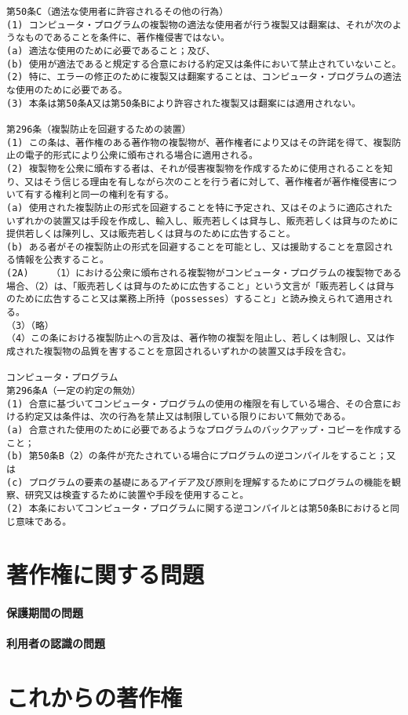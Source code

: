 \documentclass[a4j]{jsarticle}
\begin{document}
\begin{verbatim}
第50条C（適法な使用者に許容されるその他の行為）
(1)	コンピュータ・プログラムの複製物の適法な使用者が行う複製又は翻案は、それが次のようなものであることを条件に、著作権侵害ではない。
(a)	適法な使用のために必要であること；及び、
(b)	使用が適法であると規定する合意における約定又は条件において禁止されていないこと。
(2)	特に、エラーの修正のために複製又は翻案することは、コンピュータ・プログラムの適法な使用のために必要である。
(3)	本条は第50条A又は第50条Bにより許容された複製又は翻案には適用されない。

第296条（複製防止を回避するための装置）
(1)	この条は、著作権のある著作物の複製物が、著作権者により又はその許諾を得て、複製防止の電子的形式により公衆に頒布される場合に適用される。
(2)	複製物を公衆に頒布する者は、それが侵害複製物を作成するために使用されることを知り、又はそう信じる理由を有しながら次のことを行う者に対して、著作権者が著作権侵害について有する権利と同一の権利を有する。
(a)	使用された複製防止の形式を回避することを特に予定され、又はそのように適応されたいずれかの装置又は手段を作成し、輸入し、販売若しくは貸与し、販売若しくは貸与のために提供若しくは陳列し、又は販売若しくは貸与のために広告すること。
(b)	ある者がその複製防止の形式を回避することを可能とし、又は援助することを意図される情報を公表すること。
(2A)	（1）における公衆に頒布される複製物がコンピュータ・プログラムの複製物である場合、（2）は、「販売若しくは貸与のために広告すること」という文言が「販売若しくは貸与のために広告すること又は業務上所持（possesses）すること」と読み換えられて適用される。
（3）（略）
（4）この条における複製防止への言及は、著作物の複製を阻止し、若しくは制限し、又は作成された複製物の品質を害することを意図されるいずれかの装置又は手段を含む。

コンピュータ・プログラム
第296条A（一定の約定の無効）
(1)	合意に基づいてコンピュータ・プログラムの使用の権限を有している場合、その合意における約定又は条件は、次の行為を禁止又は制限している限りにおいて無効である。
(a)	合意された使用のために必要であるようなプログラムのバックアップ・コピーを作成すること；
(b)	第50条B（2）の条件が充たされている場合にプログラムの逆コンパイルをすること；又は
(c)	プログラムの要素の基礎にあるアイデア及び原則を理解するためにプログラムの機能を観察、研究又は検査するために装置や手段を使用すること。
(2)	本条においてコンピュータ・プログラムに関する逆コンパイルとは第50条Bにおけると同じ意味である。

\end{verbatim} 
\cite{def_eng}
\part{著作権に関する問題}
\subsection*{保護期間の問題}
\subsection*{利用者の認識の問題}
\part{これからの著作権}


\end{document}
